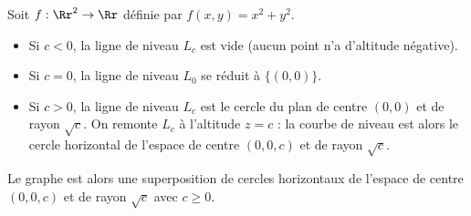 \documentclass[11pt, class=report,crop=false]{standalone}
\begin{document}
\begin{exemple}
Soit $f : \Rr^2 \to \Rr$ définie par $f(x,y)=x^2+y^2$. 

  \begin{itemize}
    \item Si $c<0$, la ligne de niveau $L_c$ est vide (aucun point n'a d'altitude négative).
    \item Si $c=0$, la ligne de niveau $L_0$ se réduit à $\{(0,0)\}$.
    \item Si $c>0$, la ligne de niveau $L_c$  est le cercle du plan de centre $(0,0)$ et de rayon $\sqrt{c}$. On remonte $L_c$ à l'altitude $z=c$ : la courbe de niveau est alors le cercle horizontal de l'espace de centre $(0,0,c)$ et de rayon $\sqrt{c}$. 
  \end{itemize}
      
Le graphe est alors une superposition de cercles horizontaux de l'espace de centre $(0,0,c)$ et de rayon $\sqrt{c}$ avec $c \ge 0$.     


\end{exemple}
\end{document}
